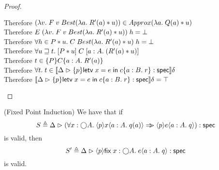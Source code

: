 \begin{proof}
\begin{tabbedproof}
    \ooooooo Therefore $(\lambda v.\;F\;v\;Best(\lambda a.\;R'(a)*u)) \in Approx(\lambda a.\;Q(a) * u)$ \\                        
    \ooooooo Therefore $E\;(\lambda v.\;F\;v\;Best(\lambda a.\;R'(a)*u))\;h = \bot$ \\
    \oooooo Therefore $\forall h \in P * u.\; C\;Best(\lambda a.\;R'(a) * u)\;h = \bot$\\
    \ooooo Therefore $\forall u \sqsupseteq t.\; [{P * u}]\;{C}\;[{a:A}.\;{(R'(a) * u)}]$ \\
    \ooooo Therefore $t \in \{{P}\}{C}\{{a:A}.\;{R'(a)}\}$ \\
    \oooo Therefore $\forall t.\; t \in [\![{{\Delta} \vartriangleright {\{{p}\}{\mathsf{letv}\;x = e\;\mathsf{in}\;c}\{{a:B}.\;{r}\}} : \mathsf{spec}}]\!]\delta$ \\
    \oooo Therefore $[\![{{\Delta} \vartriangleright {\{{p}\}{\mathsf{letv}\;x = e\;\mathsf{in}\;c}\{{a:B}.\;{r}\}} : \mathsf{spec}}]\!]\delta = \top$\\
  \end{tabbedproof}
\end{proof}

\begin{lemma}{(Fixed Point Induction)}
We have that if 
\begin{displaymath}
   S \triangleq 
   {\Delta} \vartriangleright {(\forall x:\bigcirc{A}.\; \langle{p}\rangle{x}\langle{a:A}.\;{q(a)}\rangle \Rightarrow\!\!\!>\langle{p}\rangle{e}\langle{a:A}.\;{q}\rangle)} : \mathsf{spec}
\end{displaymath}
\noindent is valid, then 
\begin{displaymath}
  S' \triangleq {\Delta} \vartriangleright {\langle{p}\rangle{\mathsf{fix}\;{x:\bigcirc{A}}.\;{e}}\langle{a:A}.\;{q}\rangle} : \mathsf{spec}
\end{displaymath}
is valid.
\end{lemma}

